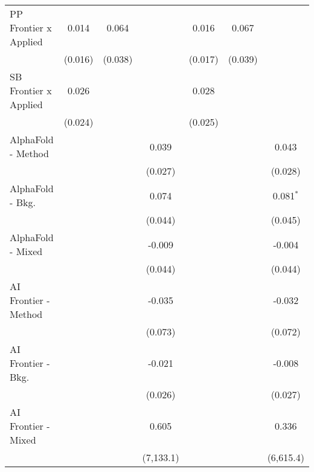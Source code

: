 \begin{tabular}{lcccccc}
   PP Frontier x Applied          & 0.014          & 0.064        &             & 0.016          & 0.067        &   \\   
                                  & (0.016)        & (0.038)      &             & (0.017)        & (0.039)      &   \\   
   SB Frontier x Applied          & 0.026          &              &             & 0.028          &              &   \\   
                                  & (0.024)        &              &             & (0.025)        &              &   \\   
   AlphaFold - Method             &                &              & 0.039       &                &              & 0.043\\   
                                  &                &              & (0.027)     &                &              & (0.028)\\   
   AlphaFold - Bkg.               &                &              & 0.074       &                &              & 0.081$^{*}$\\   
                                  &                &              & (0.044)     &                &              & (0.045)\\   
   AlphaFold - Mixed              &                &              & -0.009      &                &              & -0.004\\   
                                  &                &              & (0.044)     &                &              & (0.044)\\   
   AI Frontier - Method           &                &              & -0.035      &                &              & -0.032\\   
                                  &                &              & (0.073)     &                &              & (0.072)\\   
   AI Frontier - Bkg.             &                &              & -0.021      &                &              & -0.008\\   
                                  &                &              & (0.026)     &                &              & (0.027)\\   
   AI Frontier - Mixed            &                &              & 0.605       &                &              & 0.336\\   
                                  &                &              & (7,133.1)   &                &              & (6,615.4)\\   

\end{tabular}
